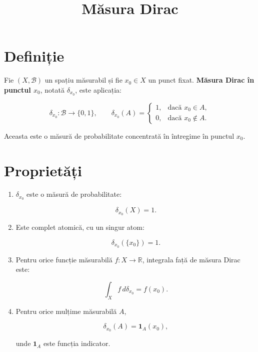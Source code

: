 \documentclass[12pt]{article}
\title{Măsura Dirac}
\author{}
\date{}
\theoremstyle{plain}
\begin{document}
\maketitle

\section{Definiție}

Fie $(X, \mathcal{B})$ un spațiu măsurabil și fie $x_0 \in X$ un punct fixat.
\textbf{Măsura Dirac în punctul $x_0$}, notată $\delta_{x_0}$, este aplicația:



\[
\delta_{x_0} : \mathcal{B} \to \{0,1\}, \qquad
\delta_{x_0}(A) = 
\begin{cases}
1, & \text{dacă } x_0 \in A, \\
0, & \text{dacă } x_0 \notin A.
\end{cases}
\]



Aceasta este o măsură de probabilitate concentrată în întregime în punctul $x_0$.

\section{Proprietăți}

\begin{enumerate}
    \item $\delta_{x_0}$ este o măsură de probabilitate:
    

\[
        \delta_{x_0}(X) = 1.
    \]



    \item Este complet atomică, cu un singur atom:
    

\[
        \delta_{x_0}(\{x_0\}) = 1.
    \]



    \item Pentru orice funcție măsurabilă $f : X \to \mathbb{R}$,
    integrala față de măsura Dirac este:
    

\[
        \int_X f \, d\delta_{x_0} = f(x_0).
    \]



    \item Pentru orice mulțime măsurabilă $A$,
    

\[
        \delta_{x_0}(A) = \mathbf{1}_A(x_0),
    \]


    unde $\mathbf{1}_A$ este funcția indicator.
\end{enumerate}
\end{document}
